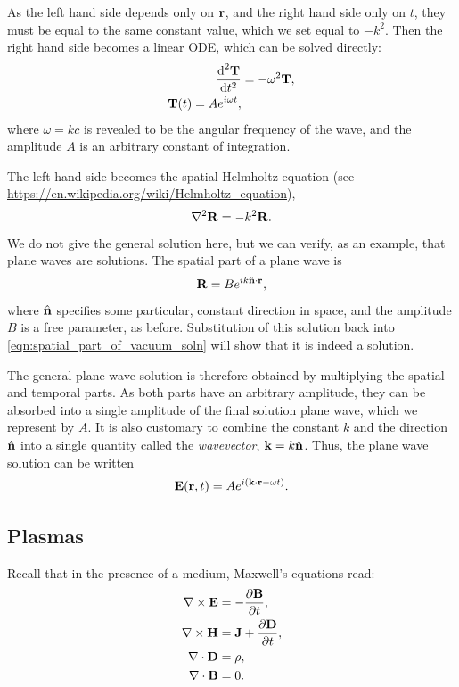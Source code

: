 \documentclass{book}
\newcommand{\derivn}[3]{\frac{\text{d}^{#3}{#1}}{\text{d}{#2}^{#3}}}
\newcommand{\pd}[2]{\frac{\partial {#1}}{\partial {#2}}}
\begin{document}
As the left hand side depends only on ${\bf r}$, and the right hand side only on $t$, they must be equal to the same constant value, which we set equal to $-k^2$.
Then the right hand side becomes a linear ODE, which can be solved directly:
\begin{equation}
    \begin{aligned}
        \derivn{\bf T}{t}{2} &= -\omega^2 {\bf T}, \\
        {\bf T}(t) = Ae^{i \omega t},
    \end{aligned}
\end{equation}
where $\omega = kc$ is revealed to be the angular frequency of the wave, and the amplitude $A$ is an arbitrary constant of integration.

The left hand side becomes the spatial Helmholtz equation (see \url{https://en.wikipedia.org/wiki/Helmholtz_equation}),
\begin{equation}
    \nabla^2 {\bf R} = -k^2 {\bf R}.
    \label{eqn:spatial_part_of_vacuum_soln}
\end{equation}
We do not give the general solution here, but we can verify, as an example, that plane waves are solutions.
The spatial part of a plane wave is
\begin{equation}
    {\bf R} = Be^{ik \hat{\bf n}\cdot {\bf r}},
\end{equation}
where $\hat{\bf n}$ specifies some particular, constant direction in space, and the amplitude $B$ is a free parameter, as before.
Substitution of this solution back into \eqref{eqn:spatial_part_of_vacuum_soln} will show that it is indeed a solution.

The general plane wave solution is therefore obtained by multiplying the spatial and temporal parts.
As both parts have an arbitrary amplitude, they can be absorbed into a single amplitude of the final solution plane wave, which we represent by $A$.
It is also customary to combine the constant $k$ and the direction $\hat{\bf n}$ into a single quantity called the \emph{wavevector}, ${\bf k} = k\hat{\bf n}$.
Thus, the plane wave solution can be written
\begin{equation}
    {\bf E}({\bf r}, t) = Ae^{i({\bf k}\cdot{\bf r} - \omega t)}.
\end{equation}

\subsection{Plasmas}

Recall that in the presence of a medium, Maxwell's equations read:
\begin{equation}
    \begin{aligned}
        \nabla \times {\bf E} &= -\pd{\bf B}{t}, \\
        \nabla \times {\bf H} &= {\bf J} + \pd{\bf D}{t}, \\
        \nabla \cdot {\bf D} &= \rho, \\
        \nabla \cdot {\bf B} &= 0.
    \end{aligned}
\end{equation}
\end{document}
